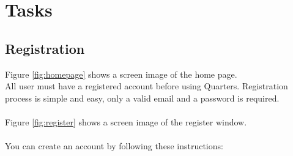 \documentclass[12pt]{article}
\begin{document}
    \section{Tasks}

    \subsection{Registration}
    \label{sec:registration}
    Figure \ref{fig:homepage} shows a screen image of the home page.\\
    All user must have a registered account before using Quarters. Registration process is simple and easy, only a valid email and a password is required.\\\\
    Figure \ref{fig:register} shows a screen image of the register window.\\\\
    You can create an account by following these instructions:
\end{document}
